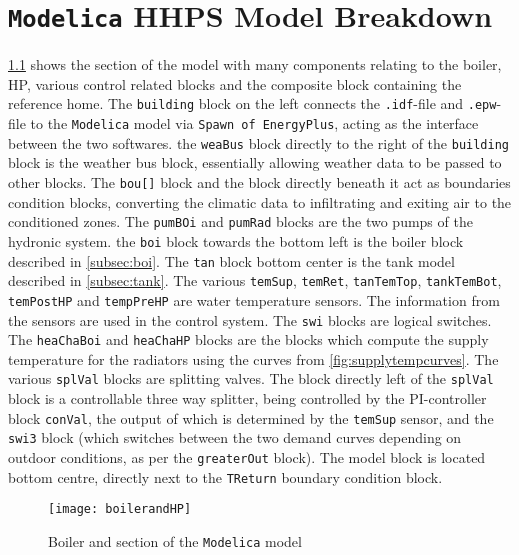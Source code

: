 \chapter{\texttt{Modelica} HHPS Model Breakdown} \label{appx:modelbreakdown}

\cref{fig:boilerandhp} shows the section of the model with many components relating to the boiler, \ac{HP}, various control related blocks and the composite block containing the reference home. The \texttt{building} block on the left connects the \texttt{.idf}-file and \texttt{.epw}-file to the \texttt{Modelica} model via \texttt{Spawn of EnergyPlus}, acting as the interface between the two softwares. the \texttt{weaBus} block directly to the right of the \texttt{building} block is the weather bus block, essentially allowing weather data to be passed to other blocks. The \texttt{bou[]} block and the block directly beneath it act as boundaries condition blocks, converting the climatic data to infiltrating and exiting air to the conditioned zones. The \texttt{pumBOi} and \texttt{pumRad} blocks are the two pumps of the hydronic system. the \texttt{boi} block towards the bottom left is the boiler block described in \cref{subsec:boi}. The \texttt{tan} block bottom center is the tank model described in \cref{subsec:tank}. The various \texttt{temSup}, \texttt{temRet}, \texttt{tanTemTop}, \texttt{tankTemBot}, \texttt{temPostHP} and \texttt{tempPreHP} are water temperature sensors. The information from the sensors are used in the control system. The \texttt{swi} blocks are logical switches. The \texttt{heaChaBoi} and \texttt{heaChaHP} blocks are the blocks which compute the supply temperature for the radiators using the curves from \cref{fig:supplytempcurves}. The various \texttt{splVal} blocks are splitting valves. The block directly left of the \texttt{splVal} block is a controllable three way splitter, being controlled by the PI-controller block \texttt{conVal}, the output of which is determined by the \texttt{temSup} sensor, and the \texttt{swi3} block (which switches between the two demand curves depending on outdoor conditions, as per the \texttt{greaterOut} block). The \HP model block is located bottom centre, directly next to the \texttt{TReturn} boundary condition block.
\begin{figure}[htb]
    \centering
    \texttt{[image: boilerandHP]}
    \caption{Boiler and \HP section of the \texttt{Modelica} model}
    \label{fig:boilerandhp}
\end{figure}

